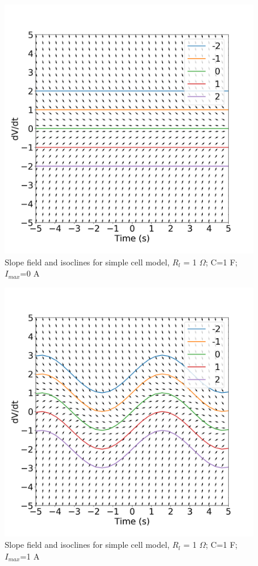 \documentclass{scrartcl}			%
\begin{document}
\begin{figure}[h]					%
	\centering
	\includegraphics[scale=0.36]{2_0.png}
	\captionsetup{width=\linewidth}  %
	\caption{Slope field and isoclines for simple cell model, $R_{l}$ = 1 $\Omega$; C=1 F; $I_{max}$=0 A}
	\label{subsec_fig2_0} %
\end{figure}

\begin{figure}[h]					%
	\centering
	\includegraphics[scale=0.36]{2_1.png}
	\captionsetup{width=\linewidth}  %
	\caption{Slope field and isoclines for simple cell model, $R_{l}$ = 1 $\Omega$; C=1 F; $I_{max}$=1 A}
	\label{subsec_fig2_1} %
\end{figure}
\end{document}
